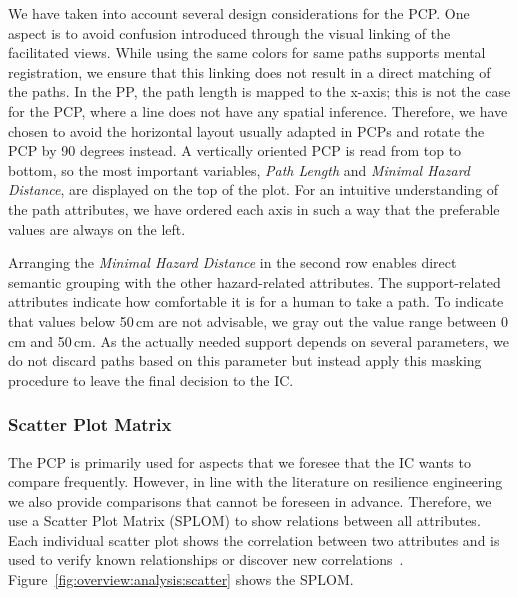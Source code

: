 \documentclass{egpubl}
\begin{document}
We have taken into account several design considerations for the PCP. One aspect is to avoid confusion introduced through the visual linking of the facilitated views. While using the same colors for same paths supports mental registration, we ensure that this linking does not result in a direct matching of the paths. In the PP, the path length is mapped to the x-axis; this is not the case for the PCP, where a line does not have any spatial inference. Therefore, we have chosen to avoid the horizontal layout usually adapted in PCPs and rotate the PCP by 90 degrees instead. A vertically oriented PCP is read from top to bottom, so the most important variables, \emph{Path Length} and \emph{Minimal Hazard Distance}, are displayed on the top of the plot. For an intuitive understanding of the path attributes, we have ordered each axis in such a way that the preferable values are always on the left. 

Arranging the \emph{Minimal Hazard Distance} in the second row enables direct semantic grouping with the other hazard-related attributes. The support-related attributes indicate how comfortable it is for a human to take a path. To indicate that values below 50\,cm are not advisable, we gray out the value range between 0\,cm and 50\,cm. As the actually needed support depends on several parameters, we do not discard paths based on this parameter but instead apply this masking procedure to leave the final decision to the IC.

\subsubsection{Scatter Plot Matrix} \label{sec:overview:analysis:scatter}
The PCP is primarily used for aspects that we foresee that the IC wants to compare frequently. However, in line with the literature on resilience engineering~\cite{Lundberg2012} we also provide comparisons that cannot be foreseen in advance. Therefore, we use a Scatter Plot Matrix (SPLOM) to show relations between all attributes. Each individual scatter plot shows the correlation between two attributes and is used to verify known relationships or discover new correlations~\cite{Li2008}. Figure~\ref{fig:overview:analysis:scatter} shows the SPLOM.
\end{document}
